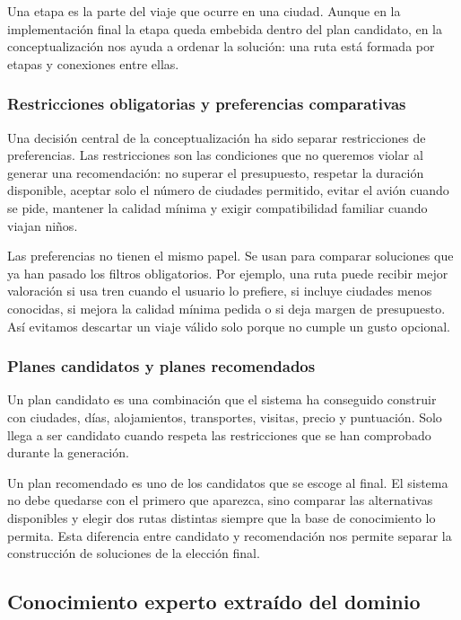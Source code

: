 \documentclass[11pt,a4paper]{article}
\begin{document}
Una etapa es la parte del viaje que ocurre en una ciudad. Aunque en la
implementaci\'on final la etapa queda embebida dentro del plan candidato, en la
conceptualizaci\'on nos ayuda a ordenar la soluci\'on: una ruta est\'a formada por
etapas y conexiones entre ellas.

\subsubsection{Restricciones obligatorias y preferencias comparativas}
Una decisi\'on central de la conceptualizaci\'on ha sido separar
restricciones de preferencias. Las restricciones son las
condiciones que no queremos violar al generar una recomendaci\'on: no superar
el presupuesto, respetar la duraci\'on disponible, aceptar solo el n\'umero de
ciudades permitido, evitar el avi\'on cuando se pide, mantener la calidad
m\'inima y exigir compatibilidad familiar cuando viajan ni\~nos.

Las preferencias no tienen el mismo papel. Se usan para comparar soluciones
que ya han pasado los filtros obligatorios. Por ejemplo, una ruta puede recibir
mejor valoraci\'on si usa tren cuando el usuario lo prefiere, si incluye
ciudades menos conocidas, si mejora la calidad m\'inima pedida o si deja margen
de presupuesto. As\'i evitamos descartar un viaje v\'alido solo porque no cumple
un gusto opcional.

\subsubsection{Planes candidatos y planes recomendados}
Un plan candidato es una combinaci\'on que el sistema ha conseguido
construir con ciudades, d\'ias, alojamientos, transportes, visitas, precio y
puntuaci\'on. Solo llega a ser candidato cuando respeta las restricciones que
se han comprobado durante la generaci\'on.

Un plan recomendado es uno de los candidatos que se escoge al final.
El sistema no debe quedarse con el primero que aparezca, sino comparar las
alternativas disponibles y elegir dos rutas distintas siempre que la base de
conocimiento lo permita. Esta diferencia entre candidato y recomendaci\'on nos
permite separar la construcci\'on de soluciones de la elecci\'on final.

\subsection{Conocimiento experto extra\'ido del dominio}
\end{document}
